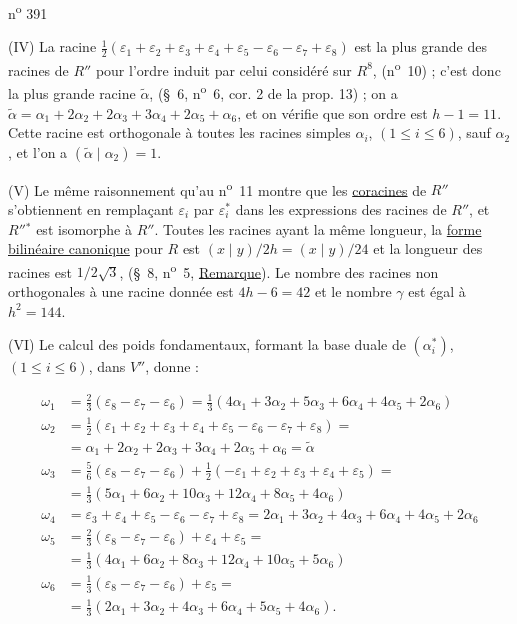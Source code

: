 \hfill n\textsuperscript{o} 391

(IV) La racine $\frac{1}{2}(\varepsilon_1+\varepsilon_2+\varepsilon_3+\varepsilon_4+\varepsilon_5-\varepsilon_6-\varepsilon_7+\varepsilon_8)$ est la plus grande des racines de $R''$ pour l'ordre induit par celui considéré sur $R^8$, (n\textsuperscript{o}~10) ; c'est donc la plus grande racine $\tilde\alpha$, (\S~6, n\textsuperscript{o}~6, cor. 2 de la prop. 13) ; on a $\tilde\alpha=\alpha_1+2\alpha_2+2\alpha_3+3\alpha_4+2\alpha_5+\alpha_6$, et on vérifie que son ordre est $h-1=11$. Cette racine est orthogonale à toutes les racines simples $\alpha_i$, $(1\leq i\leq6)$, sauf $\alpha_2$, et l'on a $(\tilde\alpha\mid\alpha_2)=1$.

(V) Le même raisonnement qu'au n\textsuperscript{o}~11 montre que les \uline{coracines} de $R''$ s'obtiennent en remplaçant $\varepsilon_i$ par $\varepsilon_i^*$ dans les expressions des racines de $R''$, et $R''{}^*$ est isomorphe à $R''$. Toutes les racines ayant la même longueur, la \uline{forme bilinéaire canonique} pour $R$ est $(x\mid y)/2h=(x\mid y)/24$ et la longueur des racines est $1/2\sqrt{3}$, (\S~8, n\textsuperscript{o}~5, \uline{Remarque}). Le nombre des racines non orthogonales à une racine donnée est $4h-6=42$ et le nombre $\gamma$ est égal à $h^2=144$.

(VI) Le calcul des poids fondamentaux, formant la base duale de $(\alpha_i^*)$, $(1\leq i\leq6)$, dans $V''$, donne :

\[
\begin{aligned}
\omega_1&=\frac{2}{3}(\varepsilon_8-\varepsilon_7-\varepsilon_6)=\frac{1}{3}(4\alpha_1+3\alpha_2+5\alpha_3+6\alpha_4+4\alpha_5+2\alpha_6)\\
\omega_2&=\frac{1}{2}(\varepsilon_1+\varepsilon_2+\varepsilon_3+\varepsilon_4+\varepsilon_5-\varepsilon_6-\varepsilon_7+\varepsilon_8)=\\
&=\alpha_1+2\alpha_2+2\alpha_3+3\alpha_4+2\alpha_5+\alpha_6=\tilde\alpha\\
\omega_3&=\frac{5}{6}(\varepsilon_8-\varepsilon_7-\varepsilon_6)+\frac{1}{2}(-\varepsilon_1+\varepsilon_2+\varepsilon_3+\varepsilon_4+\varepsilon_5)=\\
&=\frac{1}{3}(5\alpha_1+6\alpha_2+10\alpha_3+12\alpha_4+8\alpha_5+4\alpha_6)\\
\omega_4&=\varepsilon_3+\varepsilon_4+\varepsilon_5-\varepsilon_6-\varepsilon_7+\varepsilon_8=2\alpha_1+3\alpha_2+4\alpha_3+6\alpha_4+4\alpha_5+2\alpha_6\\
\omega_5&=\frac{2}{3}(\varepsilon_8-\varepsilon_7-\varepsilon_6)+\varepsilon_4+\varepsilon_5=\\
&=\frac{1}{3}(4\alpha_1+6\alpha_2+8\alpha_3+12\alpha_4+10\alpha_5+5\alpha_6)\\
\omega_6&=\frac{1}{3}(\varepsilon_8-\varepsilon_7-\varepsilon_6)+\varepsilon_5=\\
&=\frac{1}{3}(2\alpha_1+3\alpha_2+4\alpha_3+6\alpha_4+5\alpha_5+4\alpha_6).
\end{aligned}
\]

